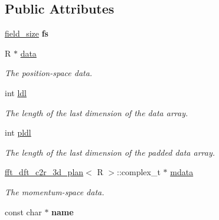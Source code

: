 \subsection*{Public Attributes}
\begin{DoxyCompactItemize}
\item 
\hypertarget{classfield_ae4706cc48462e7ff81aace174cc02c6b}{
\hyperlink{structfield__size}{field\_\-size} {\bfseries fs}}
\label{classfield_ae4706cc48462e7ff81aace174cc02c6b}

\item 
R $\ast$ \hyperlink{classfield_a5c465fa5d00104c5bbb683a6574a4057}{data}
\begin{DoxyCompactList}\small\item\em The position-\/space data. \item\end{DoxyCompactList}\item 
\hypertarget{classfield_abab5ca89b0c6dde39ce92a372d3446bf}{
int \hyperlink{classfield_abab5ca89b0c6dde39ce92a372d3446bf}{ldl}}
\label{classfield_abab5ca89b0c6dde39ce92a372d3446bf}

\begin{DoxyCompactList}\small\item\em The length of the last dimension of the data array. \item\end{DoxyCompactList}\item 
\hypertarget{classfield_a673a06623fbbe0daf28e2406c195582e}{
int \hyperlink{classfield_a673a06623fbbe0daf28e2406c195582e}{pldl}}
\label{classfield_a673a06623fbbe0daf28e2406c195582e}

\begin{DoxyCompactList}\small\item\em The length of the last dimension of the padded data array. \item\end{DoxyCompactList}\item 
\hypertarget{classfield_a49ff854ecfe1997596a425e34964af9b}{
\hyperlink{classfft__dft__c2r__3d__plan}{fft\_\-dft\_\-c2r\_\-3d\_\-plan}$<$ R $>$::complex\_\-t $\ast$ \hyperlink{classfield_a49ff854ecfe1997596a425e34964af9b}{mdata}}
\label{classfield_a49ff854ecfe1997596a425e34964af9b}

\begin{DoxyCompactList}\small\item\em The momentum-\/space data. \item\end{DoxyCompactList}\item 
\hypertarget{classfield_a0a82ffffc6d875d5b333d48a80787cdd}{
const char $\ast$ {\bfseries name}}
\label{classfield_a0a82ffffc6d875d5b333d48a80787cdd}

\end{DoxyCompactItemize}

